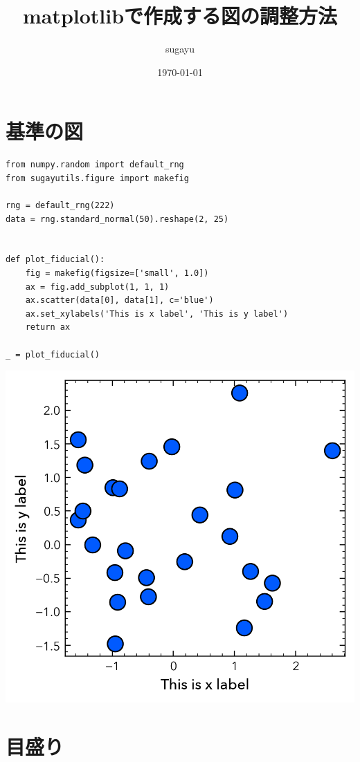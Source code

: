 \documentclass[a4paper, 10pt, notitlepage, twocolumn, uplatex, oneside, dvipdfmx]{jsarticle}
\author{sugayu}
\date{\today}
\title{\textbf{matplotlibで作成する図の調整方法}}
\begin{document}
\maketitle
\tableofcontents

\section{基準の図}
\label{sec:org1e9be9e}
\begin{verbatim}
from numpy.random import default_rng
from sugayutils.figure import makefig

rng = default_rng(222)
data = rng.standard_normal(50).reshape(2, 25)


def plot_fiducial():
    fig = makefig(figsize=['small', 1.0])
    ax = fig.add_subplot(1, 1, 1)
    ax.scatter(data[0], data[1], c='blue')
    ax.set_xylabels('This is x label', 'This is y label')
    return ax

_ = plot_fiducial()
\end{verbatim}

\begin{center}
\includegraphics[width=1.0\linewidth]{./obipy-resources/fiducial.png}
\end{center}
\section{目盛り}
\label{sec:org23a9d4e}
\end{document}
